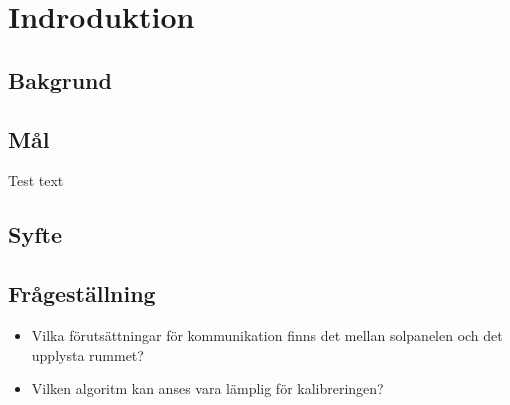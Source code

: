 \section{Indroduktion} %
\label{sec:indroduktion}

    \subsection{Bakgrund} %
    \label{sub:bakgrund}
    

    \subsection{Mål} %
    \label{sun:mal}
        Test text

    \subsection{Syfte} %
    \label{sub:syfte}
    

    \subsection{Frågeställning} %
    \label{sub:fragestallning}
        \begin{itemize}
            \item Vilka förutsättningar för kommunikation finns det mellan solpanelen och det upplysta rummet? \\
            \item Vilken algoritm kan anses vara lämplig för kalibreringen?
        \end{itemize}
